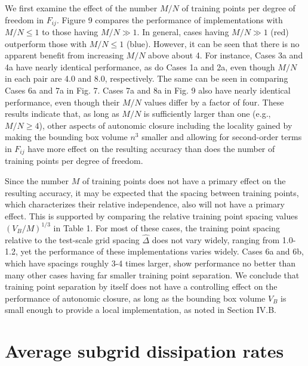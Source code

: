 We first examine the effect of the number  $M/N$ of training points per degree of freedom 
in $F_{ij}$. Figure 9 compares the performance of implementations with $M/N \leq 1$  to those having $M/N \gg 1$. In general, cases having  $M/N \gg 1$ (red) outperform those with  $M/N \leq 1$ (blue). However, it can be seen that there is no apparent benefit from increasing $M/N$ above about 4. For instance, Cases 3a and 4a have nearly identical performance, as do Cases 1a and 2a, even though  $M/N$ in each pair are 4.0 and 8.0, respectively. The same can be seen in comparing Cases 6a and 7a in Fig. 7. Cases 7a and 8a in Fig. 9 also have nearly identical performance, even though their $M/N$ values differ by a factor of four. These results indicate that, as long as $M/N$  is sufficiently larger than one (e.g., $M/N \geq 4$), other aspects of autonomic closure including the locality gained by making the bounding box volume  $n^3$ smaller and allowing for second-order terms in $F_{ij}$  have more effect on the resulting accuracy than does the number of training points per degree of freedom.

Since the number $M$ of training points does not have a primary effect on the resulting accuracy, it may be expected that the spacing between training points, which characterizes their relative independence, also will not have a primary effect. This is supported by comparing the relative training point spacing values $(V_B/M)^{1/3}$ in Table 1. For most of these cases, the training point spacing relative to the test-scale grid spacing $\widehat{\Delta}$  does not vary widely, ranging from 1.0-1.2, yet the performance of these implementations varies widely. Cases 6a and 6b, which have spacings roughly 3-4 times larger, show performance no better than many other cases having far smaller training point separation. We conclude that training point separation by itself does not have a controlling effect on the performance of autonomic closure, as long as the bounding box volume  $V_B$ is small enough to provide a local implementation, as noted in Section IV.B.

\section{Average subgrid dissipation rates }

